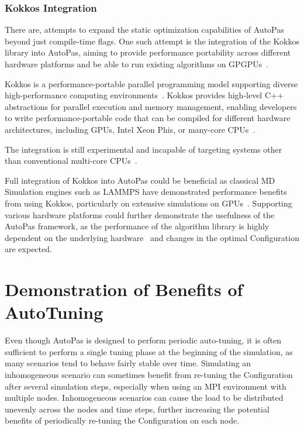 \documentclass[conference]{IEEEtran}
\begin{document}
\subsubsection{Kokkos Integration}

There are, attempts to expand the static optimization capabilities of AutoPas beyond just compile-time flags. One such attempt is the integration of the Kokkos library into AutoPas, aiming to provide performance portability across different hardware platforms and be able to run existing algorithms on GPGPUs~\cite{Gärtner_KokkosInAutoPas.pdf}.

Kokkos is a performance-portable parallel programming model supporting diverse high-performance computing environments~\cite{CARTEREDWARDS20143202}. Kokkos provides high-level C++ abstractions for parallel execution and memory management, enabling developers to write performance-portable code that can be compiled for different hardware architectures, including GPUs, Intel Xeon Phis, or many-core CPUs~\cite{lammps_kokkos}.

The integration is still experimental and incapable of targeting systems other than conventional multi-core CPUs~\cite{Gärtner_KokkosInAutoPas.pdf}.

Full integration of Kokkos into AutoPas could be beneficial as classical MD Simulation engines such as LAMMPS have demonstrated performance benefits from using Kokkos, particularly on extensive simulations on GPUs~\cite{lammps_kokkos}. Supporting various hardware platforms could further demonstrate the usefulness of the AutoPas framework, as the performance of the algorithm library is highly dependent on the underlying hardware~\cite{SECKLER2021101296} and changes in the optimal Configuration are expected.

\section{Demonstration of Benefits of AutoTuning}

Even though AutoPas is designed to perform periodic auto-tuning, it is often sufficient to perform a single tuning phase at the beginning of the simulation, as many scenarios tend to behave fairly stable over time.
Simulating an inhomogeneous scenario can sometimes benefit from re-tuning the Configuration after several simulation steps, especially when using an MPI environment with multiple nodes. Inhomogeneous scenarios can cause the load to be distributed unevenly across the nodes and time steps, further increasing the potential benefits of periodically re-tuning the Configuration on each node.
\end{document}
